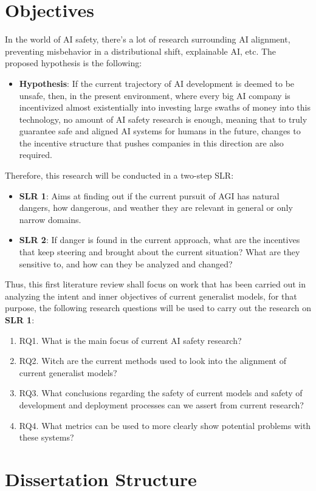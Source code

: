 \section{Objectives}

In the world of AI safety, there's a lot of research surrounding AI alignment, preventing misbehavior in a distributional shift, explainable AI, etc. The proposed hypothesis is the following:
\begin{itemize}
    \item \textbf{Hypothesis}: If the current trajectory of AI development is deemed to be unsafe, then, in the present environment, where every big AI company is incentivized almost existentially into investing large swaths of money into this technology, no amount of AI safety research is enough, meaning that to truly guarantee safe and aligned AI systems for humans in the future, changes to the incentive structure that pushes companies in this direction are also required.
\end{itemize}
Therefore, this research will be conducted in a two-step SLR:
\begin{itemize}
    \item \textbf{SLR 1}: Aims at finding out if the current pursuit of AGI has natural dangers, how dangerous, and weather they are relevant in general or only narrow domains.
    \item \textbf{SLR 2}: If danger is found in the current approach, what are the incentives that keep steering and brought about the current situation? What are they sensitive to, and how can they be analyzed and changed?
\end{itemize}

Thus, this first literature review shall focus on work that has been carried out in analyzing the intent and inner objectives of current generalist models, for that purpose, the following research questions will be used to carry out the research on \textbf{SLR 1}:

\begin{enumerate}
    \item RQ1. What is the main focus of current AI safety research?  
    \item RQ2. Witch are the current methods used to look into the alignment of current generalist models?
    \item RQ3. What conclusions regarding the safety of current models and safety of development and deployment processes can we assert from current research?
    \item RQ4. What metrics can be used to more clearly show potential problems with these systems? 
\end{enumerate}

\section{Dissertation Structure}

\newpage